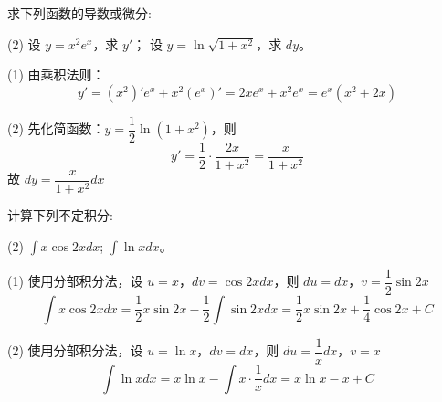 \documentclass{exam-zh}
\begin{document}
\clearpage

\begin{problem}[points = 10]
  求下列函数的导数或微分:
  \begin{tasks}[label=(\arabic*)](2)
    \task 设 $y = x^2 e^x$，求 $y'$；
    \task 设 $y = \ln \sqrt{1 + x^2}$，求 $dy$。
  \end{tasks}
\end{problem}

\begin{solution}
  (1) 由乘积法则：
  \[
  y' = (x^2)' e^x + x^2 (e^x)' = 2x e^x + x^2 e^x = e^x (x^2 + 2x)
  \]

  (2) 先化简函数：$y = \dfrac{1}{2} \ln(1 + x^2)$，则
  \[
  y' = \dfrac{1}{2} \cdot \dfrac{2x}{1 + x^2} = \dfrac{x}{1 + x^2}
  \]
  故 $dy = \dfrac{x}{1 + x^2} dx$
\end{solution}

\begin{problem}[points = 10]
  计算下列不定积分:
  \begin{tasks}[label=(\arabic*)](2)
    \task $\int x \cos 2x dx$;
    \task $\int \ln x dx$。
  \end{tasks}
\end{problem}

\begin{solution}
  (1) 使用分部积分法，设 $u = x$，$dv = \cos 2x dx$，则 $du = dx$，$v = \dfrac{1}{2} \sin 2x$
  \[
  \int x \cos 2x dx = \dfrac{1}{2} x \sin 2x - \dfrac{1}{2} \int \sin 2x dx = \dfrac{1}{2} x \sin 2x + \dfrac{1}{4} \cos 2x + C
  \]

  (2) 使用分部积分法，设 $u = \ln x$，$dv = dx$，则 $du = \dfrac{1}{x} dx$，$v = x$
  \[
  \int \ln x dx = x \ln x - \int x \cdot \dfrac{1}{x} dx = x \ln x - x + C
  \]
\end{solution}
\end{document}
